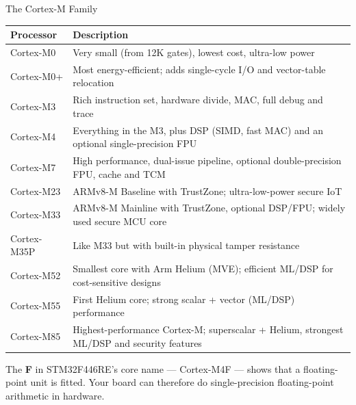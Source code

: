 \documentclass[9pt,aspectratio=169,xcolor=table]{beamer}
\begin{document}
\begin{frame}{The Cortex-M Family}
	\begin{center}
		{\small
			\striped
			\begin{tabular}{lp{}}
				\toprule
				\textbf{Processor} & \textbf{Description} \\
				\midrule
				Cortex-M0  & Very small (from 12K gates), lowest cost, ultra-low power \\
				Cortex-M0+ & Most energy-efficient; adds single-cycle I/O and vector-table relocation \\
				Cortex-M3  & Rich instruction set, hardware divide, MAC, full debug and trace \\
				\alert{Cortex-M4} & {Everything in the M3, plus DSP (SIMD, fast MAC) and an optional
					single-precision FPU} \\
				Cortex-M7  & High performance, dual-issue pipeline, optional double-precision FPU, cache and TCM \\
				Cortex-M23 & ARMv8-M Baseline with TrustZone; ultra-low-power secure IoT \\
				Cortex-M33 & ARMv8-M Mainline with TrustZone, optional DSP/FPU; widely used secure MCU core \\
				Cortex-M35P & Like M33 but with built-in physical tamper resistance \\
				Cortex-M52 & Smallest core with Arm Helium (MVE); efficient ML/DSP for cost-sensitive designs \\
				Cortex-M55 & First Helium core; strong scalar + vector (ML/DSP) performance \\
				Cortex-M85 & Highest-performance Cortex-M; superscalar + Helium, strongest ML/DSP and security features \\
				\bottomrule
		\end{tabular}}
	\end{center}
	\vspace{2mm}
	{\small The \textbf{F} in STM32F446RE's core name --- Cortex-M4\alert{F} --- shows that a floating-point unit is fitted. Your board can therefore do single-precision floating-point arithmetic in hardware.}
\end{frame}
\end{document}
